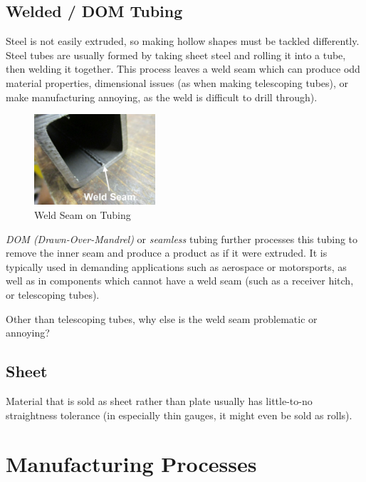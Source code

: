  \subsection{Welded / DOM Tubing} 
 Steel is not easily extruded, so making hollow shapes must be tackled differently. Steel tubes are usually formed by taking sheet steel and rolling it into a tube, then welding it together. This process leaves a weld seam which can produce odd material properties, dimensional issues (as when making telescoping tubes), or make manufacturing annoying, as the weld is difficult to drill through). 
 
   \begin{figure}[H]
	\centering
	\includegraphics[width=0.4\textwidth]{imgs/welded_tube_seam.png}
	
	\caption{Weld Seam on Tubing}
\end{figure}
 
 \textit{DOM (Drawn-Over-Mandrel)} or \textit{seamless} tubing further processes this tubing to remove the inner seam and produce a product as if it were extruded. It is typically used in demanding applications such as aerospace or motorsports, as well as in components which cannot have a weld seam (such as a receiver hitch, or telescoping tubes).

\addvspace{2.0ex}
 \begin{qbox}
 	Other than telescoping tubes, why else is the weld seam problematic or annoying?
 \end{qbox}
 
 \subsection{Sheet}
 Material that is sold as sheet rather than plate usually has little-to-no straightness tolerance (in especially thin gauges, it might even be sold as rolls).
 
 \section{Manufacturing Processes}
 
